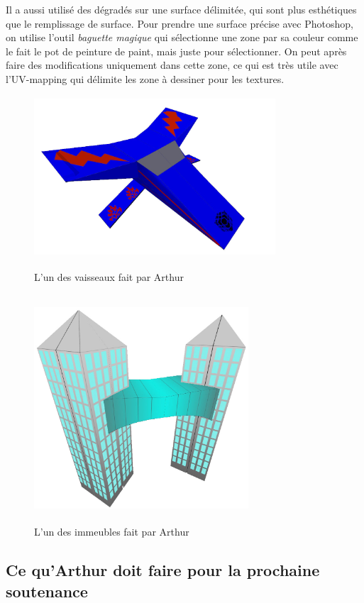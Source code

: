 \documentclass[10pt, titlepage]{report}
\begin{document}
 Il a aussi utilisé des dégradés sur une surface délimitée, qui sont plus esthétiques que le remplissage de surface. Pour prendre une surface précise avec Photoshop, on utilise l'outil \textit{baguette magique} qui sélectionne une zone par sa couleur comme le fait le pot de peinture de paint, mais juste pour sélectionner. On peut après faire des modifications uniquement dans cette zone, ce qui est très utile avec l'UV-mapping qui délimite les zone à dessiner pour les textures.\\

\begin{figure}
\center
\includegraphics[height=6cm, width=9cm]{vaisseau_arthur.jpg}
\caption{L'un des vaisseaux fait par Arthur}

\includegraphics[height=8.5cm, width=8cm]{batiment_arthur.jpg}
\caption{L'un des immeubles fait par Arthur}

\end{figure}

\subsection{Ce qu'Arthur doit faire pour la prochaine soutenance}
\end{document}
